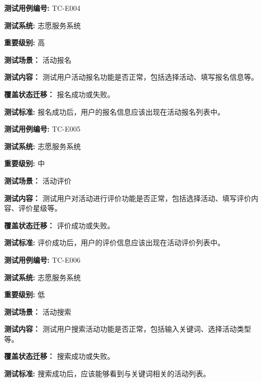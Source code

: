 \begin{framed} \textbf{测试用例编号:} TC-E004

\textbf{测试系统:} 志愿服务系统

\textbf{重要级别:} 高

\textbf{测试场景：} 活动报名

\textbf{测试内容：} 测试用户活动报名功能是否正常，包括选择活动、填写报名信息等。

\textbf{覆盖状态迁移：} 报名成功或失败。

\textbf{测试标准:} 报名成功后，用户的报名信息应该出现在活动报名列表中。

\begin{center}  \end{center} \end{framed}

\begin{framed} \textbf{测试用例编号:} TC-E005

\textbf{测试系统:} 志愿服务系统

\textbf{重要级别:} 中

\textbf{测试场景：} 活动评价

\textbf{测试内容：} 测试用户对活动进行评价功能是否正常，包括选择活动、填写评价内容、评价星级等。

\textbf{覆盖状态迁移：} 评价成功或失败。

\textbf{测试标准:} 评价成功后，用户的评价信息应该出现在活动评价列表中。

\begin{center}  \end{center} \end{framed}

\begin{framed} \textbf{测试用例编号:} TC-E006

\textbf{测试系统:} 志愿服务系统

\textbf{重要级别:} 低

\textbf{测试场景：} 活动搜索

\textbf{测试内容：} 测试用户搜索活动功能是否正常，包括输入关键词、选择活动类型等。

\textbf{覆盖状态迁移：} 搜索成功或失败。

\textbf{测试标准:} 搜索成功后，应该能够看到与关键词相关的活动列表。

\begin{center}  \end{center} \end{framed}

